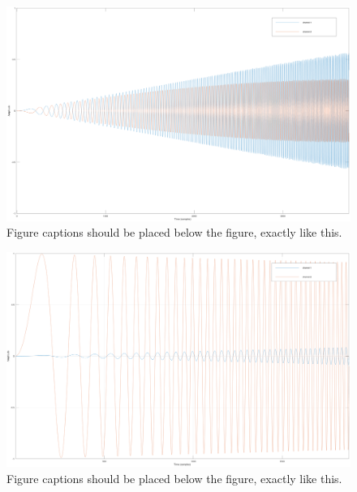 \documentclass{article}
\begin{document}
\begin{figure}[t]
\centering
\includegraphics[width=1\columnwidth]{MS2LR-180deg-2}
\caption{Figure captions should be placed below the figure,
exactly like this.\label{fig:example}}
\end{figure}

\begin{figure}[t]
\centering
\includegraphics[width=1\columnwidth]{LIN-LR}
\caption{Figure captions should be placed below the figure,
exactly like this.\label{fig:example}}
\end{figure}
\end{document}
